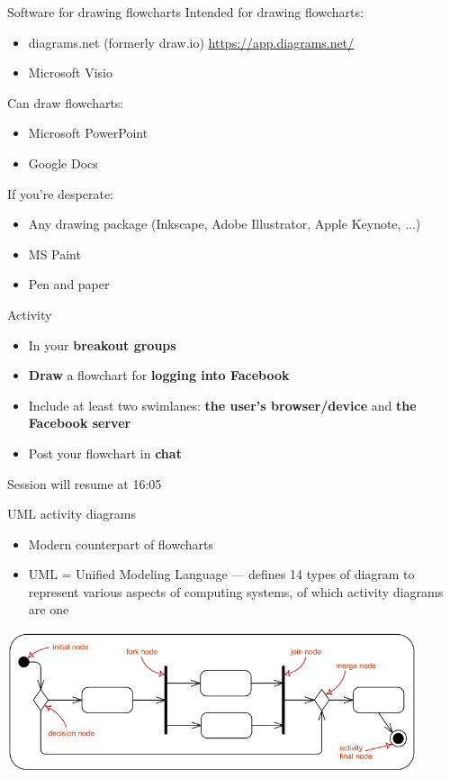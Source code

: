 \begin{frame}{Software for drawing flowcharts}
	\pause Intended for drawing flowcharts:
	\begin{itemize}
		\item diagrams.net (formerly draw.io) \url{https://app.diagrams.net/}
		\item Microsoft Visio
	\end{itemize}
	\pause Can draw flowcharts:
	\begin{itemize}
		\item Microsoft PowerPoint
		\item Google Docs
	\end{itemize}
	\pause If you're desperate:
	\begin{itemize}
		\item Any drawing package (Inkscape, Adobe Illustrator, Apple Keynote, ...)
		\item MS Paint
		\item Pen and paper
	\end{itemize}
\end{frame}

\begin{frame}{Activity}
	\begin{itemize}
		\item In your \textbf{breakout groups}
		\item \textbf{Draw} a flowchart for \textbf{logging into Facebook}
		\item Include at least two swimlanes: \textbf{the user's browser/device} and \textbf{the Facebook server}
		\item Post your flowchart in \textbf{chat}
	\end{itemize}
\end{frame}

\begin{frame}
	\begin{center}
		Session will resume at 16:05
	\end{center}
\end{frame}

\begin{frame}{UML activity diagrams}
	\begin{itemize}
		\pause\item Modern counterpart of flowcharts
		\pause\item UML = Unified Modeling Language --- defines 14 types of diagram to represent various aspects of computing systems, of which activity diagrams are one
	\end{itemize}
	\pause
	\begin{center}
		\includegraphics[width=0.9\textwidth]{uml_symbols}
	\end{center}
\end{frame}

